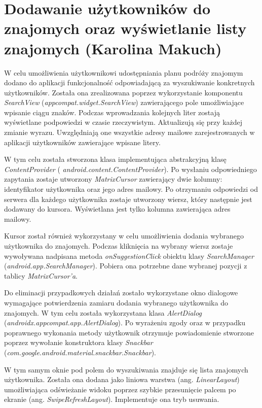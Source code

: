 \documentclass[10pt,twoside,a4paper]{report}
\begin{document}
\section{Dodawanie użytkowników do znajomych oraz wyświetlanie listy znajomych (Karolina Makuch)}
\par W celu umożliwienia użytkownikowi udostępniania planu podróży znajomym dodano do aplikacji funkcjonalność odpowiadającą za wyszukiwanie konkretnych użytkowników. Została ona zrealizowana poprzez  wykorzystanie komponentu \textit{SearchView} (\textit{appcompat.widget.SearchView}) zawierającego pole umożliwiające wpisanie ciągu znaków. Podczas wprowadzania kolejnych liter zostają wyświetlane podpowiedzi w czasie rzeczywistym. Aktualizują się  przy każdej zmianie wyrazu. Uwzględniają one wszystkie adresy mailowe zarejestrowanych w aplikacji użytkowników zawierające wpisane  litery.
\par W tym celu została stworzona klasa implementująca abstrakcyjną klasę \textit{ContentProvider} ( \textit{android.content.ContentProvider}). Po wysłaniu odpowiedniego zapytania zostaje utworzony \textit{MatrixCursor} zawierający dwie kolumny: identyfikator użytkownika oraz jego adres mailowy. Po otrzymaniu odpowiedzi od serwera dla każdego użytkownika zostaje utworzony wiersz, który następnie jest dodawany do kursora. Wyświetlana jest tylko kolumna zawierająca adres mailowy.
\par Kursor został również wykorzystany w celu umożliwienia dodania wybranego użytkownika do znajomych. Podczas kliknięcia na wybrany wiersz zostaje wywoływana nadpisana metoda \textit{onSuggestionClick} obiektu klasy \textit{SearchManager} (\textit{android.app.SearchManager}). Pobiera ona potrzebne dane wybranej pozycji z tablicy \textit{MatrixCursor’a}.
\par Do eliminacji przypadkowych działań zostało wykorzystane okno dialogowe wymagające potwierdzenia  zamiaru dodania wybranego użytkownika do znajomych. W tym celu została wykorzystana klasa \textit{AlertDialog} (\textit{androidx.appcompat.app.AlertDialog}). Po wyrażeniu zgody  oraz w przypadku poprawnego wykonania metody użytkownik otrzymuje powiadomienie stworzone poprzez wywołanie konstruktora klasy \textit{Snackbar} (\textit{com.google.android.material.snackbar.Snackbar}).
\par W tym samym oknie pod polem do wyszukiwania znajduje się lista znajomych użytkownika. Została ona dodana jako liniowa warstwa (ang. \textit{LinearLayout}) umożliwiająca odświeżanie widoku poprzez szybkie przesunięcie palcem po ekranie (ang. \textit{SwipeRefreshLayout}). Implementuje ona tryb usuwania.
\end{document}
